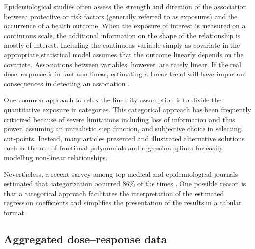 \documentclass[11pt,a4paper,twoside,openany]{book}\usepackage{knitr}
\begin{document}
{Epidemiological studies often assess the strength and direction of the association between protective or risk factors (generally referred to as exposures) and the occurrence of a health outcome. When the exposure of interest is measured on a continuous scale, the additional information on the shape of the relationship is mostly of interest. Including the continuous variable simply as covariate in the appropriate statistical model assumes that the outcome linearly depends on the covariate. Associations between variables, however, are rarely linear. If the real dose--response is in fact non-linear, estimating a linear trend will have important consequences in detecting an association \citep{harrell2015regression}. 

One common approach to relax the linearity assumption is to divide the quantitative exposure in categories. This categorical approach has been frequently criticized because of severe limitations \citep{royston2006dichotomizing, greenland1995dose} including loss of information and thus power, assuming an unrealistic step function, and subjective choice in selecting cut-points. Instead, many articles presented and illustrated alternative solutions such as the use of fractional polynomials and regression splines for easily modelling non-linear relationships. 

Nevertheless, a recent survey among top medical and epidemiological journals estimated that categorization occurred 86\% of the times \citep{turner2010categorisation}. One possible reason is that a categorical approach facilitates the interpretation of the estimated regression coefficients and simplifies the presentation of the results in a tabular format \citep{orsini2011procedure}. 


\subsection{Aggregated dose--response data}

}
\end{document}
